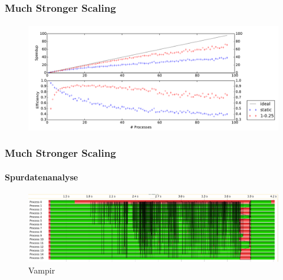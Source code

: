 \begin{frame}
    \frametitle{Much Stronger Scaling}
    \framesubtitle{{}}

    \begin{figure}
        \centering
        \includegraphics[width=\textwidth]{content/img/strong_scaling_time_final}
    \end{figure}

\end{frame}

\begin{frame}
    \frametitle{Much Stronger Scaling}
    \framesubtitle{Spurdatenanalyse}

    \begin{figure}
        \centering
        \includegraphics[width=\textwidth]{content/img/vampir_dynamic}
        \caption{Vampir}
    \end{figure}

\end{frame}

